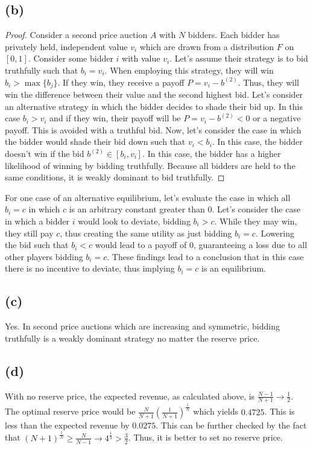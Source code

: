 \documentclass[10pt,a4paper]{article}
\begin{document}
  \subsection*{(b)}
    \begin{proof}
      Consider a second price auction $A$ with $N$ bidders. Each bidder has privately held, independent value $v_i$ which are drawn from a distribution $F$ on $[0,1]$. Consider some bidder $i$ with value $v_i$. Let's assume their strategy is to bid truthfully such that $b_i=v_i$. When employing this strategy, they will win \iff $b_i > \max\{b_j\}$. If they win, they receive a payoff $P = v_i - b^{(2)}$. Thus, they will win the difference between their value and the second highest bid. Let's consider an alternative strategy in which the bidder decides to shade their bid up. In this case $b_i>v_i$ and if they win, their payoff will be $P = v_i - b^{(2)} < 0$ or a negative payoff. This is avoided with a truthful bid. Now, let's consider the case in which the bidder would shade their bid down such that $v_i<b_i$. In this case, the bidder doesn't win if the bid $b^{(2)}\in[b_i, v_i]$. In this case, the bidder has a higher likelihood of winning by bidding truthfully. Because all bidders are held to the same conditions, it is weakly dominant to bid truthfully.
    \end{proof}
    For one case of an alternative equilibrium, let's evaluate the case in which all $b_i = c$ in which $c$ is an arbitrary constant greater than $0$. Let's consider the case in which a bidder $i$ would look to deviate, bidding $b_i>c$. While they may win, they still pay $c$, thus creating the same utility as just bidding $b_i=c$. Lowering the bid such that $b_i<c$ would lead to a payoff of $0$, guaranteeing a loss due to all other players bidding $b_i=c$. These findings lead to a conclusion that in this case there is no incentive to deviate, thus implying $b_i=c$ is an equilibrium. 
  \subsection*{(c)}
    Yes. In second price auctions which are increasing and symmetric, bidding truthfully is a weakly dominant strategy no matter the reserve price.
  \subsection*{(d)}
    With no reserve price, the expected revenue, as calculated above, is $\frac{N-1}{N+1} \rightarrow  \frac{1}{2}$. The optimal reserve price would be $\frac{N}{N+1}(\frac{1}{N+1})^{\frac{1}{N}}$ which yields $0.4725$. This is less than the expected revenue by $0.0275$. This can be further checked by the fact that $(N+1)^{\frac{1}{N}} \geq \frac{N}{N-1} \rightarrow 4^{\frac{1}{3}}>\frac{3}{2}$. Thus, it is better to set no reserve price. 
\end{document}
